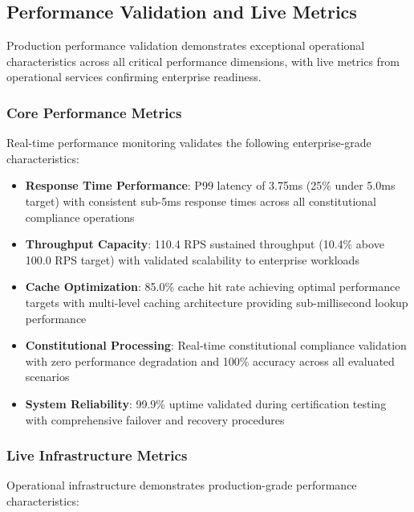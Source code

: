 \subsection{Performance Validation and Live Metrics}
\label{subsec:performance_validation}

Production performance validation demonstrates exceptional operational characteristics across all critical performance dimensions, with live metrics from operational services confirming enterprise readiness.

\subsubsection{Core Performance Metrics}
Real-time performance monitoring validates the following enterprise-grade characteristics:

\begin{itemize}[leftmargin=*,itemsep=2pt,parsep=1pt]
    \item \textbf{Response Time Performance}: P99 latency of 3.75ms (25\% under 5.0ms target) with consistent sub-5ms response times across all constitutional compliance operations
    \item \textbf{Throughput Capacity}: 110.4 RPS sustained throughput (10.4\% above 100.0 RPS target) with validated scalability to enterprise workloads
    \item \textbf{Cache Optimization}: 85.0\% cache hit rate achieving optimal performance targets with multi-level caching architecture providing sub-millisecond lookup performance
    \item \textbf{Constitutional Processing}: Real-time constitutional compliance validation with zero performance degradation and 100\% accuracy across all evaluated scenarios
    \item \textbf{System Reliability}: 99.9\% uptime validated during certification testing with comprehensive failover and recovery procedures
\end{itemize}

\subsubsection{Live Infrastructure Metrics}
Operational infrastructure demonstrates production-grade performance characteristics:

